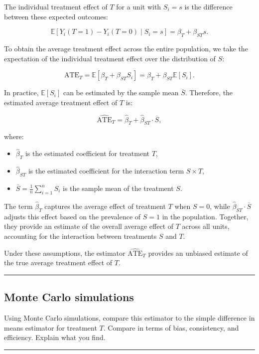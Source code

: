 \documentclass{article}
\newenvironment{colorparagraph}[1]{\par\color{#1}}{\par}
\begin{document}
The individual treatment effect of \(T\) for a unit with \(S_i = s\) is the difference between these expected outcomes:

\[
\mathbb{E}[Y_i(T=1) - Y_i(T=0) \mid S_i = s] = \beta_T + \beta_{ST} s.
\]

To obtain the average treatment effect across the entire population, we take the expectation of the individual treatment effect over the distribution of \(S\):

\[
\text{ATE}_T = \mathbb{E}[\beta_T + \beta_{ST} S_i] = \beta_T + \beta_{ST} \mathbb{E}[S_i].
\]

In practice, \(\mathbb{E}[S_i]\) can be estimated by the sample mean \(\overline{S}\). Therefore, the estimated average treatment effect of \(T\) is:

\[
\hat{\text{ATE}}_T = \hat{\beta}_T + \hat{\beta}_{ST} \cdot \overline{S},
\]

where:
\begin{itemize}
    \item \(\hat{\beta}_T\) is the estimated coefficient for treatment \(T\),
    \item \(\hat{\beta}_{ST}\) is the estimated coefficient for the interaction term \(S \times T\),
    \item \(\overline{S} = \frac{1}{n} \sum_{i=1}^n S_i\) is the sample mean of the treatment \(S\).
\end{itemize}

The term \(\hat{\beta}_T\) captures the average effect of treatment \(T\) when \(S = 0\), while \(\hat{\beta}_{ST} \cdot \overline{S}\) adjusts this effect based on the prevalence of \(S = 1\) in the population. Together, they provide an estimate of the overall average effect of \(T\) across all units, accounting for the interaction between treatments \(S\) and \(T\).

Under these assumptions, the estimator \(\hat{\text{ATE}}_T\) provides an unbiased estimate of the true average treatment effect of \(T\).

\begin{colorparagraph}{questioncolor}
\rule{\textwidth}{0.5pt}

\label{q3d}\subsection{Monte Carlo simulations}
Using Monte Carlo simulations, compare this estimator to the simple difference in means estimator for treatment \(T\). Compare in terms of bias, consistency, and efficiency. Explain what you find.

\rule{\textwidth}{0.5pt}
\end{colorparagraph}
\end{document}
